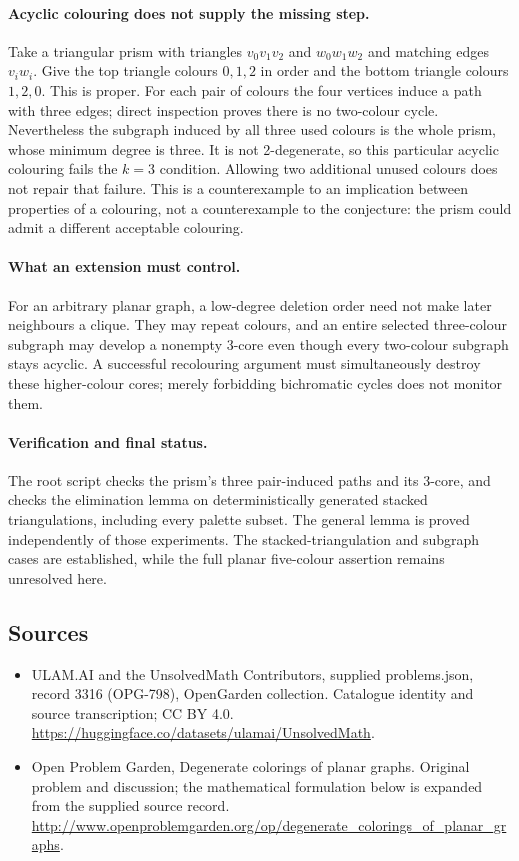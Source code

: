 \documentclass[11pt,a4paper]{article}
\begin{document}
\paragraph{Acyclic colouring does not supply the missing step.}
Take a triangular prism with triangles $v_0v_1v_2$ and $w_0w_1w_2$
and matching edges $v_iw_i$. Give the top triangle colours $0,1,2$
in order and the bottom triangle colours $1,2,0$. This is proper.
For each pair of colours the four vertices induce a path with three
edges; direct inspection proves there is no two-colour cycle.
Nevertheless the subgraph induced by all three used colours is the
whole prism, whose minimum degree is three. It is not 2-degenerate,
so this particular acyclic colouring fails the $k=3$ condition.
Allowing two additional unused colours does not repair that failure.
This is a counterexample to an implication between properties of a
colouring, not a counterexample to the conjecture: the prism could
admit a different acceptable colouring.

\paragraph{What an extension must control.}
For an arbitrary planar graph, a low-degree deletion order need not
make later neighbours a clique. They may repeat colours, and an
entire selected three-colour subgraph may develop a nonempty
3-core even though every two-colour subgraph stays acyclic.
A successful recolouring argument must simultaneously destroy
these higher-colour cores; merely forbidding bichromatic cycles
does not monitor them.

\paragraph{Verification and final status.}
The root script checks the prism's three pair-induced paths and its
3-core, and checks the elimination lemma on deterministically
generated stacked triangulations, including every palette subset.
The general lemma is proved independently of those experiments.
The stacked-triangulation and subgraph cases are established, while
the full planar five-colour assertion remains unresolved here.

\subsection{Sources}
\begin{itemize}
\item[S1] ULAM.AI and the UnsolvedMath Contributors, supplied problems.json, record 3316 (OPG-798), OpenGarden collection. Catalogue identity and source transcription; CC BY 4.0.
\url{https://huggingface.co/datasets/ulamai/UnsolvedMath}.
\item[S2] Open Problem Garden, Degenerate colorings of planar graphs. Original problem and discussion; the mathematical formulation below is expanded from the supplied source record.
\url{http://www.openproblemgarden.org/op/degenerate_colorings_of_planar_graphs}.

\end{itemize}
\end{document}
